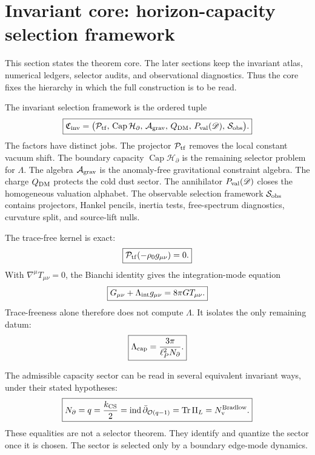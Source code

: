 \documentclass[aps,prd,reprint,nofootinbib,superscriptaddress,floatfix]{revtex4-2}
\numberwithin{equation}{section}
\theoremstyle{definition}
\theoremstyle{plain}
\newcommand{\Dil}{\mathscr D}
\newcommand{\Agrav}{\mathcal A_{\rm grav}}
\newcommand{\Cinv}{\mathfrak C_{\rm inv}}
\newcommand{\Ncap}{N_{\partial}}
\newcommand{\Capacity}{\operatorname{Cap}}
\newcommand{\Ptr}{\mathcal P_{\rm tf}}
\begin{document}
\section{Invariant core: horizon-capacity selection framework}

This section states the theorem core.  The later sections keep the invariant atlas, numerical ledgers, selector audits, and observational diagnostics.  Thus the core fixes the hierarchy in which the full construction is to be read.

The invariant selection framework is the ordered tuple
\begin{equation}
\boxed{
\Cinv
=
\bigl(
\Ptr,\,
\Capacity\mathcal H_\partial,\,
\Agrav,\,
Q_{\rm DM},\,
P_{\rm val}(\Dil),\,
\mathcal S_{\rm obs}
\bigr).
}
\end{equation}
The factors have distinct jobs.  The projector \(\Ptr\) removes the local constant vacuum shift.  The boundary capacity \(\Capacity\mathcal H_\partial\) is the remaining selector problem for \(\Lambda\).  The algebra \(\Agrav\) is the anomaly-free gravitational constraint algebra.  The charge \(Q_{\rm DM}\) protects the cold dust sector.  The annihilator \(P_{\rm val}(\Dil)\) closes the homogeneous valuation alphabet.  The observable selection framework \(\mathcal S_{\rm obs}\) contains projectors, Hankel pencils, inertia tests, free-spectrum diagnostics, curvature split, and source-lift nulls.

The trace-free kernel is exact:
\begin{equation}
\boxed{\Ptr(-\rho_0g_{\mu\nu})=0.}
\end{equation}
With \(\nabla^\mu T_{\mu\nu}=0\), the Bianchi identity gives the integration-mode equation
\begin{equation}
\boxed{
G_{\mu\nu}+\Lambda_{\rm int}g_{\mu\nu}=8\pi G T_{\mu\nu}.
}
\end{equation}
Trace-freeness alone therefore does not compute \(\Lambda\).  It isolates the only remaining datum:
\begin{equation}
\boxed{
\Lambda_{\rm cap}=\frac{3\pi}{\ell_P^2\Ncap}.
}
\end{equation}

The admissible capacity sector can be read in several equivalent invariant ways, under their stated hypotheses:
\begin{equation}
\boxed{
\Ncap
=
q
=
\frac{k_{\rm CS}}2
=
\operatorname{ind}\bar\partial_{\mathcal O(q-1)}
=
\operatorname{Tr}\Pi_L
=
N_{\rm v}^{\rm Bradlow}.
}
\end{equation}
These equalities are not a selector theorem.  They identify and quantize the sector once it is chosen.  The sector is selected only by a boundary edge-mode dynamics.
\end{document}

